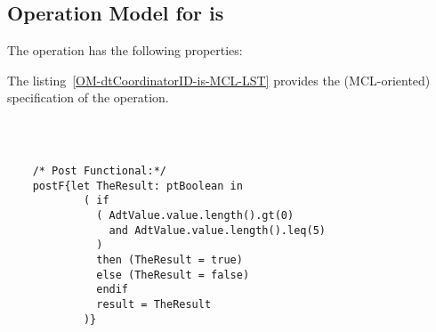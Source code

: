 \subsection{Operation Model for is}

\label{OM-is}


The  operation has the following properties:

	\begin{operationmodel}



		


	\end{operationmodel}



	\vspace{1cm}
	The listing~\ref{OM-dtCoordinatorID-is-MCL-LST} provides the \msrmessir (MCL-oriented) specification of the operation.
	
	\scriptsize
	\vspace{0.5cm}
	\begin{lstlisting}[style=MessirStyle,firstnumber=auto,captionpos=b,caption={\msrmessir (MCL-oriented) specification of the operation \emph{is}.},label=OM-dtCoordinatorID-is-MCL-LST]

	
	
	/* Post Functional:*/ 
	postF{let TheResult: ptBoolean in
	        ( if
	          ( AdtValue.value.length().gt(0)
	            and AdtValue.value.length().leq(5)
	          )
	          then (TheResult = true)
	          else (TheResult = false)
	          endif
	          result = TheResult
	        )}
	
	
	\end{lstlisting}
	\normalsize 
	
	
	
	





